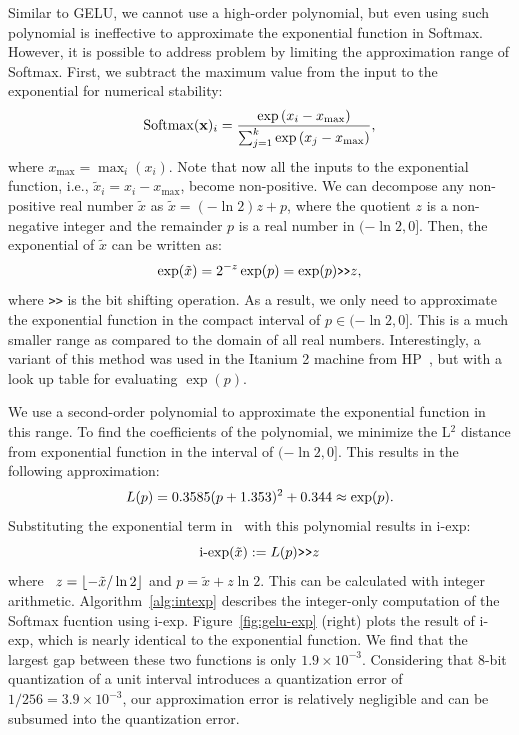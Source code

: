Similar to GELU, we cannot use a high-order polynomial, but even using such polynomial
is ineffective to approximate the exponential function in Softmax.
However, it is possible to address problem by limiting the approximation range of Softmax.
First, we subtract the maximum value from the input to the exponential for numerical stability:
\begin{equation}
\label{eqn:softmax2} 
\small
\mathrm{Softmax}(\mathbf{x})_i = \frac{\exp{(x_i - x_{\max})}}{\sum_{j=1}^k \exp{(x_j - x_{\max})}},
\end{equation}
where $x_{\max} = \max_i(x_i)$.
Note that now all the inputs to the exponential function, i.e., $\tilde x_i = x_i - x_{\max}$, become non-positive.
We can decompose any 
non-positive real number $\tilde x$ as $\tilde x = (-\ln{2})z + p$,
where the quotient $z$ is a non-negative integer and the remainder $p$ is a real number in $(-\ln2, 0]$. 
Then, the exponential of $\tilde x$ can be written as:
\begin{equation}
\label{eqn:expshift}
\small
\exp(\tilde x) = 2^{-z} \exp(p) = \exp(p) \verb|>>| z,
\end{equation}
where \verb|>>| is the bit shifting operation.
As a result, we only need to approximate the exponential function in the compact interval of $p\in(-\ln2, 0]$.
This is a much smaller range as compared to the domain of all real numbers.
Interestingly, a variant of this method was used in the Itanium 2 machine from HP~\cite{thomas2004libm,detrey2005parameterized}, but with a look up table
for evaluating $\exp(p)$.

We use a second-order polynomial to approximate the exponential
function in this range. To find the coefficients of the polynomial, we minimize the  L$^2$ distance from exponential function in the interval of $(-\ln2, 0]$. 
This results in the following approximation:
\begin{equation}
\label{eq:bestL_exp}
\small
L(p) = 0.3585 (p + 1.353)^2 + 0.344 \approx \exp(p). 
\end{equation}
Substituting the exponential term in~ with this polynomial results in i-exp:
\begin{equation}
\label{eqn:iexp}
\mathrm{i\text{-}exp}(\tilde x) := L(p) \verb|>>| z  
\end{equation}
where $\enspace z = \lfloor -\tilde x / \ln 2 \rfloor$ and $p = \tilde x + z \ln 2$. This can be calculated with integer arithmetic.
Algorithm~\ref{alg:intexp} describes the integer-only computation of the Softmax fucntion using i-exp.
Figure~\ref{fig:gelu-exp} (right) plots the result of i-exp, 
which is nearly identical to the exponential function.
We find that the largest gap between these two functions is only $1.9 \times 10^{-3}$.
Considering that 8-bit quantization of a unit interval introduces a quantization error of $1/256 = 3.9 \times 10^{-3}$, our approximation error is relatively negligible and can be subsumed into the quantization error. 

